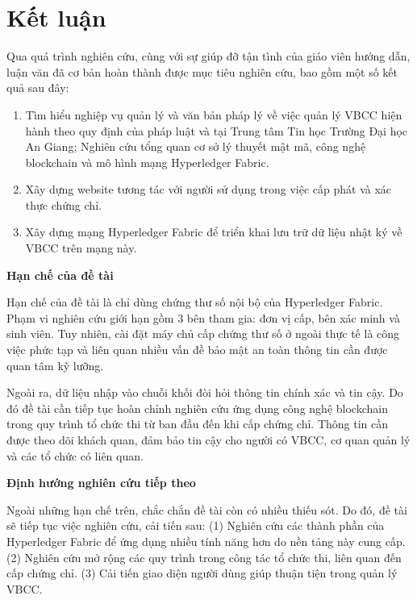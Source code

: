 \chapter{Kết luận}
Qua quá trình nghiên cứu, cùng với sự giúp đỡ tận tình của giáo viên hướng dẫn, luận văn đã cơ bản hoàn thành được mục tiêu nghiên cứu, bao gồm một số kết quả sau đây:

\begin{enumerate}

\item Tìm hiểu nghiệp vụ quản lý và văn bản pháp lý về việc quản lý VBCC hiện hành theo quy định của pháp luật và tại Trung tâm Tin học Trường Đại học An Giang; Nghiên cứu tổng quan cơ sở lý thuyết mật mã, công nghệ blockchain và mô hình mạng Hyperledger Fabric.

\item Xây dựng website tương tác với người sử dụng trong việc cấp phát và xác thực chứng chỉ.

\item Xây dựng mạng Hyperledger Fabric để triển khai lưu trữ dữ liệu nhật ký về VBCC trên mạng này.
\end{enumerate}

\textbf{Hạn chế của đề tài}

Hạn chế của đề tài là chỉ dùng chứng thư số nội bộ của Hyperledger Fabric. Phạm vi nghiên cứu giới hạn gồm 3 bên tham gia: đơn vị cấp, bên xác minh và sinh viên. Tuy nhiên, cài đặt máy chủ cấp chứng thư số ở ngoài thực tế là công việc phức tạp và liên quan nhiều vấn đề bảo mật an toàn thông tin cần được quan tâm kỹ lưỡng.

Ngoài ra, dữ liệu nhập vào chuỗi khối đòi hỏi thông tin chính xác và tin cậy. Do đó đề tài cần tiếp tục hoàn chỉnh nghiên cứu ứng dụng công nghệ blockchain trong quy trình tổ chức thi từ ban đầu đến khi cấp chứng chỉ. Thông tin cần được theo dõi khách quan, đảm bảo tin cậy cho người có VBCC, cơ quan quản lý  và các tổ chức có liên quan.

\textbf{Định hướng nghiên cứu tiếp theo}

Ngoài những hạn chế trên, chắc chắn đề tài còn có nhiều thiếu sót. Do đó, đề tài sẽ tiếp tục việc nghiên cứu, cải tiến sau: (1) Nghiên cứu các thành phần của Hyperledger Fabric để ứng dụng nhiều tính năng hơn do nền tảng này cung cấp.  (2) Nghiên cứu mở rộng các quy trình trong công tác tổ chức thi, liên quan đến cấp chứng chỉ. (3) Cải tiến giao diện người dùng giúp thuận tiện trong quản lý VBCC.
